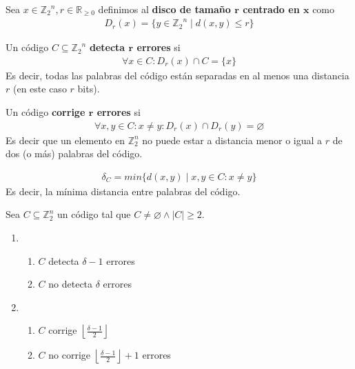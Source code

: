 \begin{definition}
Sea $x\in {\mathbb{Z}_2}^n, r \in \mathbb{R}_{\ge 0}$ definimos al \textbf{disco de tamaño $\boldsymbol{r}$ centrado en $\boldsymbol{x}$} como \begin{align}
D_r(x) = \{y \in {\mathbb{Z}_2}^n\mid d(x,y) \le r\}
\end{align}
\end{definition}

\begin{definition}
Un código $C \subseteq {\mathbb{Z}_2}^n$ \textbf{detecta $\boldsymbol{r}$ errores} si \begin{align}
\forall x\in C: D_r(x) \cap C = \{x\}
\end{align}
Es decir, todas las palabras del código están separadas en al menos una distancia $r$ (en este caso $r$ bits).
\end{definition}

\begin{definition}
Un código \textbf{corrige $\boldsymbol{r}$ errores} si \begin{align}
\forall x,y \in C : x\neq y: D_r(x) \cap D_r(y) = \varnothing
\end{align}
Es decir que un elemento en $\mathbb{Z}_2^n$ no puede estar a distancia menor o igual a $r$ de dos (o más) palabras del código.
\end{definition}

\begin{definition}
\begin{align}
    \delta_C = min \{ d(x,y) \mid x,y \in C: x \neq y \}
\end{align}
Es decir, la mínima distancia entre palabras del código.
\end{definition}

\begin{theorem}
Sea $C \subseteq \mathbb{Z}_2^n$ un código tal que $C \neq \varnothing \wedge |C| \ge 2$.
\begin{enumerate}
\item
    \begin{enumerate}
        \item $C$ detecta $\delta - 1$ errores
        \item $C$ no detecta $\delta$ errores
    \end{enumerate}
\item
    \begin{enumerate}
        \item $C$ corrige $\left\lfloor{\frac{\delta - 1}{2}}\right\rfloor$
        \item $C$ no corrige $\left\lfloor{\frac{\delta - 1}{2}}\right\rfloor + 1$ errores
    \end{enumerate}
\end{enumerate}
\end{theorem}

